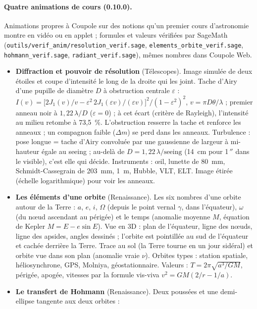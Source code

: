 \paragraph{Quatre animations de cours (0.10.0).} Animations propres à Coupole sur des notions qu'un premier cours
d'astronomie montre en vidéo ou en applet ; formules et valeurs vérifiées par SageMath
(\texttt{outils/verif\_anim/resolution\_verif.sage}, \texttt{elements\_orbite\_verif.sage}, \texttt{hohmann\_verif.sage},
\texttt{radiant\_verif.sage}), mêmes nombres dans Coupole Web.
\begin{itemize}
\item \textbf{Diffraction et pouvoir de résolution} (Télescopes). Image simulée de deux étoiles et coupe d'intensité le
long de la droite qui les joint. Tache d'Airy d'une pupille de diamètre $D$ à obstruction centrale $\varepsilon$ :
$I(v)=\big[2J_1(v)/v-\varepsilon^2\,2J_1(\varepsilon v)/(\varepsilon v)\big]^2/(1-\varepsilon^2)^2$, $v=\pi D\theta/\lambda$ ;
premier anneau noir à $1{,}22\,\lambda/D$ ($\varepsilon=0$) ; à cet écart (critère de Rayleigh), l'intensité au milieu
retombe à 73,5~\%. L'obstruction resserre la tache et renforce les anneaux ; un compagnon faible ($\Delta m$) se perd
dans les anneaux. Turbulence : pose longue = tache d'Airy convoluée par une gaussienne de largeur à mi-hauteur égale au
seeing ; au-delà de $D=1{,}22\,\lambda/\text{seeing}$ (14~cm pour 1\,$''$ dans le visible), c'est elle qui décide.
Instruments : œil, lunette de 80~mm, Schmidt-Cassegrain de 203~mm, 1~m, Hubble, VLT, ELT. Image étirée
(échelle logarithmique) pour voir les anneaux.
\item \textbf{Les éléments d'une orbite} (Renaissance). Les six nombres d'une orbite autour de la Terre : $a$, $e$, $i$,
$\Omega$ (depuis le point vernal $\gamma$, dans l'équateur), $\omega$ (du nœud ascendant au périgée) et le temps
(anomalie moyenne $M$, équation de Kepler $M=E-e\sin E$). Vue en 3D : plan de l'équateur, ligne des nœuds, ligne des
apsides, angles dessinés ; l'orbite est pointillée au sud de l'équateur et cachée derrière la Terre. Trace au sol (la
Terre tourne en un jour sidéral) et orbite vue dans son plan (anomalie vraie $\nu$). Orbites types : station spatiale,
héliosynchrone, GPS, Molniya, géostationnaire. Valeurs : $T=2\pi\sqrt{a^3/GM}$, périgée, apogée, vitesses par la
formule vis-viva $v^2=GM(2/r-1/a)$.
\item \textbf{Le transfert de Hohmann} (Renaissance). Deux poussées et une demi-ellipse tangente aux deux orbites :

\end{itemize}
